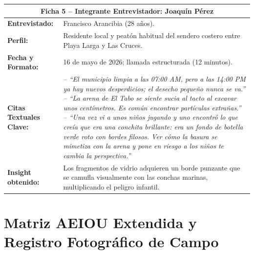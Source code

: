 \documentclass[12pt,letterpaper]{article}
\begin{document}
\begin{table}[h!]
\centering
\small
{}
\begin{tabularx}{\textwidth}{p{3.2cm}X}
\toprule
\multicolumn{2}{c}{\textbf{Ficha 5 -- Integrante Entrevistador: Joaquín Pérez}} \\
\midrule
\textbf{Entrevistado:} & Francisco Arancibia (28 años). \\
\textbf{Perfil:} & Residente local y peatón habitual del sendero costero entre Playa Larga y Las Cruces. \\
\textbf{Fecha y Formato:} & 16 de mayo de 2026; llamada estructurada (12 minutos). \\
\textbf{Citas Textuales Clave:} & 
\textit{-- ``El municipio limpia a las 07:00 AM, pero a las 14:00 PM ya hay nuevos desperdicios; el desecho pequeño nunca se va.''} \newline
\textit{-- ``La arena de El Tabo se siente sucia al tacto al excavar unos centímetros. Es común encontrar partículas extrañas.''} \newline
\textit{-- ``Una vez vi a unos niños jugando y uno encontró lo que creía que era una conchita brillante: era un fondo de botella verde roto con bordes filosos. Ver cómo la basura se mimetiza con la arena y pone en riesgo a los niños te cambia la perspectiva.''} \\
\textbf{Insight obtenido:} & Los fragmentos de vidrio adquieren un borde punzante que se camufla visualmente con las conchas marinas, multiplicando el peligro infantil. \\
\bottomrule
\end{tabularx}
\end{table}

\clearpage

\section{Matriz AEIOU Extendida y Registro Fotográfico de Campo}
\label{anexo:aeiou}
\end{document}
